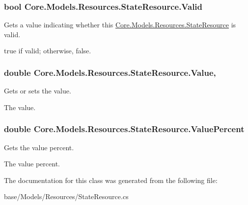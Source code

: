 \subsubsection[{Valid}]{\setlength{\rightskip}{0pt plus 5cm}bool Core.\+Models.\+Resources.\+State\+Resource.\+Valid\hspace{0.3cm}{\ttfamily [get]}}\label{classCore_1_1Models_1_1Resources_1_1StateResource_aeae95bd23d41b66b1c88aab78860b9d6}


Gets a value indicating whether this \hyperlink{classCore_1_1Models_1_1Resources_1_1StateResource}{Core.\+Models.\+Resources.\+State\+Resource} is valid. 

{\ttfamily true} if valid; otherwise, {\ttfamily false}.\hypertarget{classCore_1_1Models_1_1Resources_1_1StateResource_a5c76991dca189e22972d84c8a7809436}{}
\subsubsection[{Value}]{\setlength{\rightskip}{0pt plus 5cm}double Core.\+Models.\+Resources.\+State\+Resource.\+Value\hspace{0.3cm}{\ttfamily [get]}, {\ttfamily [set]}}\label{classCore_1_1Models_1_1Resources_1_1StateResource_a5c76991dca189e22972d84c8a7809436}


Gets or sets the value. 

The value.\hypertarget{classCore_1_1Models_1_1Resources_1_1StateResource_a375bb8b4d96a0a0e0e3512185b1a2346}{}
\subsubsection[{Value\+Percent}]{\setlength{\rightskip}{0pt plus 5cm}double Core.\+Models.\+Resources.\+State\+Resource.\+Value\+Percent\hspace{0.3cm}{\ttfamily [get]}}\label{classCore_1_1Models_1_1Resources_1_1StateResource_a375bb8b4d96a0a0e0e3512185b1a2346}


Gets the value percent. 

The value percent.

The documentation for this class was generated from the following file\+:\begin{DoxyCompactItemize}
\item 
base/\+Models/\+Resources/State\+Resource.\+cs\end{DoxyCompactItemize}
